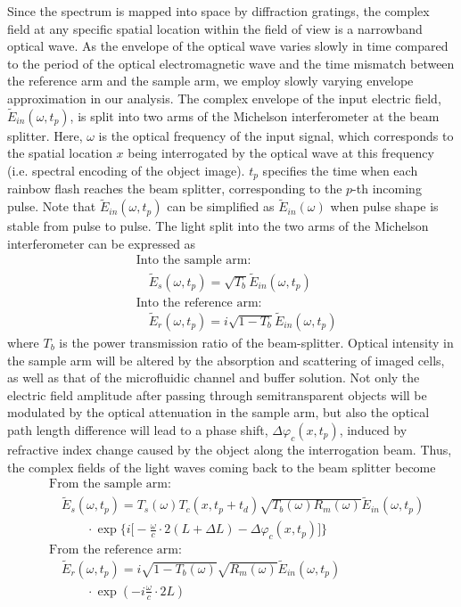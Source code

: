 \documentclass[aps,pra,reprint,superscriptaddress]{revtex4-1}
\begin{document}
Since the spectrum is mapped into space by diffraction gratings, the complex field at any specific spatial location within the field of view is a narrowband optical wave. As the envelope of the optical wave varies slowly in time compared to the period of the optical electromagnetic wave and the time mismatch between the reference arm and the sample arm, we employ slowly varying envelope approximation in our analysis. The complex envelope of the input electric field, $\tilde{E}_{in}(\omega, t_p)$, is split into two arms of the Michelson interferometer at the beam splitter. Here, $\omega$ is the optical frequency of the input signal, which corresponds to the spatial location $x$ being interrogated by the optical wave at this frequency (i.e. spectral encoding of the object image). $t_p$ specifies the time when each rainbow flash reaches the beam splitter, corresponding to the $p$-th incoming pulse. Note that $\tilde{E}_{in}(\omega,t_p)$ can be simplified as $\tilde{E}_{in}(\omega)$ when pulse shape is stable from pulse to pulse. The light split into the two arms of the Michelson interferometer can be expressed as
\begin{equation}
\begin{split}
&\text{Into the sample arm:} \\
&\quad \tilde{E}_s(\omega, t_p) = \sqrt{T_b} \tilde{E}_{in}(\omega, t_p)  \\
&\text{Into the reference arm:} \\
&\quad \tilde{E}_r(\omega, t_p) = i \sqrt{1-T_b} \tilde{E}_{in}(\omega, t_p)
\end{split}
\end{equation}
where $T_b$ is the power transmission ratio of the beam-splitter. Optical intensity in the sample arm will be altered by the absorption and scattering of imaged cells, as well as that of the microfluidic channel and buffer solution. Not only the electric field amplitude after passing through semitransparent objects will be modulated by the optical attenuation in the sample arm, but also the optical path length difference will lead to a phase shift, $\Delta\varphi_c(x,t_p)$, induced by refractive index change caused by the object along the interrogation beam. Thus, the complex fields of the light waves coming back to the beam splitter become
\begin{equation}
\begin{split}
&\text{From the sample arm:}\\
&\quad \tilde{E}_s(\omega, t_p) = T_s(\omega) T_c(x,t_p + t_d) \sqrt{T_b(\omega) R_m(\omega)} \tilde{E}_{in}(\omega, t_p) \\
&\quad\quad\quad \cdot \exp \Big\lbrace i\Big[-\frac{\omega}{c} \cdot 2(L+\Delta L) - \Delta\varphi_c(x,t_p)\Big] \Big\rbrace\\
&\text{From the reference arm:} \\
&\quad \tilde{E}_r(\omega, t_p) = i \sqrt{1-T_b(\omega)} \sqrt{R_m(\omega)} \tilde{E}_{in}(\omega, t_p) \\
&\quad\quad\quad \cdot \exp(- i \frac{\omega}{c}\cdot 2L)
\end{split}
\end{equation}
\end{document}
